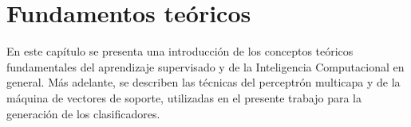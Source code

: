 %
%
%
%
\iflatexml{}\else\setcounter{chapter}{1}\fi%
%
\chapter{Fundamentos teóricos}
%
%
En este capítulo se presenta una introducción de los conceptos
teóricos fundamentales del aprendizaje supervisado y de la
Inteligencia Computacional en general.
Más adelante, se describen las técnicas del perceptrón multicapa y de
la máquina de vectores de soporte, utilizadas en el presente trabajo
para la generación de los clasificadores.
